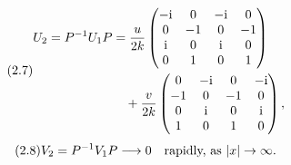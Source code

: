 \begin{equation}
\originaleq{2.7}
\begin{aligned}
U_2=P^{-1}U_1P
&=\dfrac{u}{2k}
\begin{pmatrix}-\ii&0&-\ii&0\\0&-1&0&-1\\\ii&0&\ii&0\\0&1&0&1\end{pmatrix}\\
&\quad+\dfrac{v}{2k}
\begin{pmatrix}0&-\ii&0&-\ii\\-1&0&-1&0\\0&\ii&0&\ii\\1&0&1&0\end{pmatrix},
\end{aligned}
\end{equation}
\begin{equation}
\originaleq{2.8}
V_2=P^{-1}V_1P\longrightarrow0\quad\text{rapidly, as }|x|\to\infty.
\end{equation}
